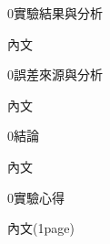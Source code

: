 \documentclass{article}
\begin{document}
\begin{center}
\fontsize{18pt}
     0實驗結果與分析
\end{center}
\begin{large}
    內文
\end{large}


\begin{center}
\fontsize{18pt}
     0誤差來源與分析
\end{center}
\begin{large}
    內文
\end{large}


\begin{center}
\fontsize{18pt}
     0結論
\end{center}
\begin{large}
    內文
\end{large}


\begin{center}
\fontsize{18pt}
     0實驗心得
\end{center}
\begin{large}
    內文(1page)
\end{large}

\end{document}
